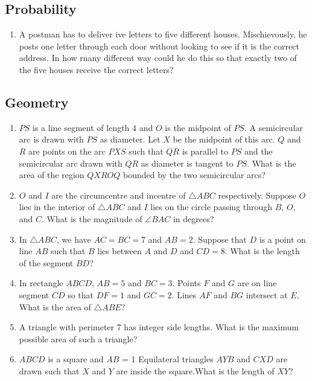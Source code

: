 \documentclass[12pt,-letter paper]{article}
\begin{document}
\begin{center}
\section*{Probability}
\end{center}
\begin{enumerate}
\item A postman has to deliver ive letters to five different houses. Mischievously, he posts one letter through each door without looking to see if it is the correct address. In how rnany different way could he do this so that exactly two of the five houses receive the correct letters?
\end{enumerate}
\begin{center}
\section*{Geometry}
\end{center}
\begin{enumerate}
\item $PS$ is a line segment of length 4 and $O$ is the midpoint of $PS$. A semicircular arc is drawn with $PS$ as diameter. Let $X$ be the midpoint of this arc. $Q$ and $R$ are points on the arc $PXS$ such that $QR$ is parallel to $PS$ and the semicircular arc drawn with $QR$ as diameter is tangent to $PS$. What is the area of the region $QXROQ$ bounded by the two semicircular arcs?
\item $O$ and $I$ are the circumcentre and incentre of $\triangle ABC$ respectively. Suppose $O$ lies in the interior of $\triangle ABC$ and $I$ lies on the circle passing through $B$, $O$, and $C$. What is the magnitude of $\angle BAC$ in degrees?
\item In $\triangle ABC$, we have $AC = BC = 7$ and $AB = 2$. Suppose that $D$ is a point on line $AB$ such that $B$ lies between $A$ and $D$ and $CD = 8$. What is the length of the segment $BD$?
\item In rectangle $ABCD$, $AB = 5$ and $BC = 3$. Points $F$ and $G$ are on line segment $CD$ so that $DF = 1$ and $GC = 2$. Lines $AF$ and $BG$ intersect at $E$. What is the area of $\triangle ABE$?
\item A triangle with perimeter 7 has integer side lengths. What is the maximum possible area of such a triangle?
\item $ABCD$ is a square and $AB$ = 1 Equilateral triangles $AYB$ and $CXD$ are drawn such that $X$ and $Y$ are inside the square.What is the length of $XY$?
\end{enumerate}
\end{document}
